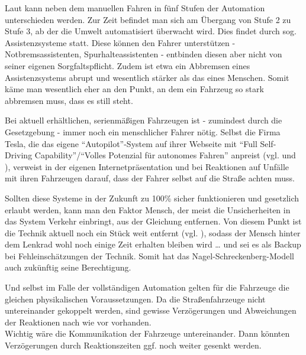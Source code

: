 Laut \cite{automation-level} kann neben dem manuellen Fahren in fünf Stufen der Automation unterschieden werden.
Zur Zeit befindet man sich am Übergang von Stufe 2 zu Stufe 3, ab der die Umwelt automatisiert überwacht wird.
Dies findet durch sog. Assistenzsysteme statt.
Diese können den Fahrer unterstützen - Notbremsassistenten, Spurhalteassistenten - entbinden diesen aber nicht von seiner eigenen Sorgfaltspflicht.
Zudem ist etwa ein Abbremsen eines Assistenzsystems abrupt und wesentlich stärker als das eines Menschen.
Somit käme man wesentlich eher an den Punkt, an dem ein Fahrzeug so stark abbremsen muss, dass es still steht.

Bei aktuell erhältlichen, serienmäßigen Fahrzeugen ist - zumindest durch die Gesetzgebung - immer noch ein menschlicher Fahrer nötig.
Selbst die Firma Tesla, die das eigene \enquote{Autopilot}-System auf ihrer Webseite mit \enquote{Full Self-Driving Capability}/\enquote{Volles Potenzial für autonomes Fahren} anpreist (vgl. \cite{tesla-en} und \cite{tesla-de}), verweist in der eigenen Internetpräsentation und bei Reaktionen auf Unfälle mit ihren Fahrzeugen darauf, dass der Fahrer selbst auf die Straße achten muss. \cite{firetruck-accident}

Sollten diese Systeme in der Zukunft zu 100\% sicher funktionieren und gesetzlich erlaubt werden, kann man den Faktor Mensch, der meist die Unsicherheiten in das System Verkehr einbringt, aus der Gleichung entfernen.
Von diesem Punkt ist die Technik aktuell noch ein Stück weit entfernt (vgl. \cite{how-far-is-autonomous-driving}), sodass der Mensch hinter dem Lenkrad wohl noch einige Zeit erhalten bleiben wird \ldots\hspace{0.05em} und sei es als Backup bei Fehleinschätzungen der Technik.
Somit hat das Nagel-Schreckenberg-Modell auch zukünftig seine Berechtigung.

Und selbst im Falle der vollständigen Automation gelten für die Fahrzeuge die gleichen physikalischen Voraussetzungen.
Da die Straßenfahrzeuge nicht untereinander gekoppelt werden, sind gewisse Verzögerungen und Abweichungen der Reaktionen nach wie vor vorhanden.
\\
Wichtig wäre die Kommunikation der Fahrzeuge untereinander.
Dann könnten Verzögerungen durch Reaktionszeiten ggf. noch weiter gesenkt werden.

